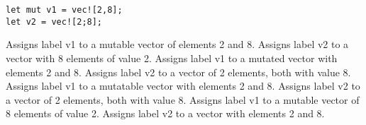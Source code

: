 %
%

\begin{lstlisting}
let mut v1 = vec![2,8];
let v2 = vec![2;8];
\end{lstlisting}

\choice Assigns label v1 to a mutable vector of elements 2 and 8. Assigns label v2 to a vector with 8 elements of value 2.
\choice Assigns label v1 to a mutated vector with elements 2 and 8. Assigns label v2 to a vector of 2 elements, both with value 8.
\choice Assigns label v1 to a mutatable vector with elements 2 and 8. Assigns label v2 to a vector of 2 elements, both with value 8.
\choice Assigns label v1 to a mutable vector of 8 elements of value 2. Assigns label v2 to a vector with elements 2 and 8.

